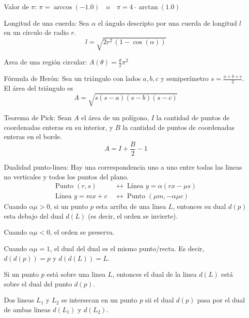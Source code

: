 Valor de $\pi$: $ \pi = \arccos(-1.0) \quad \text{o} \quad \pi = 4 \cdot \arctan(1.0) $

Longitud de una cuerda: Sea $\alpha$ el ángulo descripto por una cuerda de longitud $l$ en un círculo de radio $r$.  $$ l = \sqrt{2r^2 \, (1 - \cos(\alpha))} $$ 

Area de una región circular: $A(\theta) = \frac{\theta}{2} \pi^2$

Fórmula de Herón: Sea un triángulo con lados $a, b, c$ y semiperímetro $s=\tfrac{a+b+c}{2}$. El área del triángulo es $$A = \sqrt{s(s-a)(s-b)(s-c)}$$

Teorema de Pick: Sean $A$ el área de un polígono, $I$ la cantidad de puntos de coordenadas enteras en su interior, y $B$ la cantidad de puntos de coordenadas enteras en el borde.  $$ A = I + \frac{B}{2} - 1 $$

Dualidad punto-linea: Hay una correspondencia uno a uno entre todas las lineas no verticales y todos los puntos del plano.
\begin{align*}
\text{Punto } (r,s)
  &\;\longleftrightarrow\; \text{Línea } y = \alpha (r x - \mu s) \\
\text{Línea } y = mx + c
  &\;\longleftrightarrow\; \text{Punto } (\mu m, -\alpha \mu c)
\end{align*}
Cuando $\alpha \mu > 0$, si un punto $p$ esta arriba de una linea $L$, entonces
su dual $d(p)$ esta debajo del dual $d(L)$ (es decir, el orden se invierte).

Cuando $\alpha \mu < 0$, el orden se preserva.

Cuando $\alpha \mu = 1$, el dual del dual es el mismo punto/recta. Es decir, $d(d(p))=p$ y $d(d(L))=L$.

Si un punto $p$ está sobre una linea $L$, entonces el dual de la linea $d(L)$ está sobre el dual del punto $d(p)$.

Dos lineas $L_1$ y $L_2$ se intersecan en un punto $p$ sii el dual $d(p)$ pasa por el dual de ambas lineas $d(L_1)$ y $d(L_2)$.

